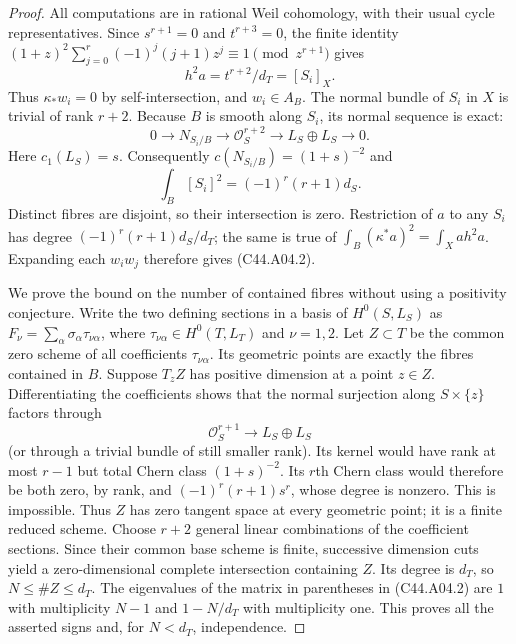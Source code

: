 \documentclass[11pt]{article}
\theoremstyle{remark}\newtheorem{remark}[theorem]{Remark}
\begin{document}
\begin{proof}
All computations are in rational Weil cohomology, with their usual
cycle representatives. Since $s^{r+1}=0$ and $t^{r+3}=0$, the finite
identity $(1+z)^2\sum_{j=0}^r(-1)^j(j+1)z^j\equiv1\pmod{z^{r+1}}$
gives
\[
                      h^2a=t^{r+2}/d_T=[S_i]_X.
\]
Thus $\kappa_*w_i=0$ by self-intersection, and $w_i\in A_B$.
The normal bundle of $S_i$ in $X$ is trivial of rank $r+2$.
Because $B$ is smooth along $S_i$, its normal sequence is exact:
\[
 0\longrightarrow N_{S_i/B}\longrightarrow\mathcal O_S^{r+2}
   \longrightarrow L_S\oplus L_S\longrightarrow0.
\]
Here $c_1(L_S)=s$. Consequently
$c(N_{S_i/B})=(1+s)^{-2}$ and
\[
                 \int_B[S_i]^2=(-1)^r(r+1)d_S.
\]
Distinct fibres are disjoint, so their intersection is zero.
Restriction of $a$ to any $S_i$ has degree
$(-1)^r(r+1)d_S/d_T$; the same is true of
$\int_B(\kappa^*a)^2=\int_Xa h^2a$.
Expanding each $w_iw_j$ therefore gives (C44.A04.2).

We prove the bound on the number of contained fibres without using a
positivity conjecture. Write the two defining sections in a basis of
$H^0(S,L_S)$ as
$F_\nu=\sum_\alpha\sigma_\alpha\tau_{\nu\alpha}$,
where $\tau_{\nu\alpha}\in H^0(T,L_T)$ and $\nu=1,2$.
Let $Z\subset T$ be the common zero scheme of all coefficients
$\tau_{\nu\alpha}$. Its geometric points are exactly the fibres
contained in $B$. Suppose $T_zZ$ has positive dimension at a point
$z\in Z$. Differentiating the coefficients shows that the normal
surjection along $S\times\{z\}$ factors through
\[
       \mathcal O_S^{r+1}\longrightarrow L_S\oplus L_S
\]
(or through a trivial bundle of still smaller rank). Its kernel
would have rank at most $r-1$ but total Chern class $(1+s)^{-2}$.
Its $r$th Chern class would therefore be both zero, by rank, and
$(-1)^r(r+1)s^r$, whose degree is nonzero. This is impossible.
Thus $Z$ has zero tangent space at every geometric point; it is a
finite reduced scheme. Choose $r+2$ general linear combinations of
the coefficient sections. Since their common base scheme is finite,
successive dimension cuts yield a zero-dimensional complete
intersection containing $Z$. Its degree is $d_T$, so
$N\le\#Z\le d_T$.
The eigenvalues of the matrix in parentheses in (C44.A04.2) are
$1$ with multiplicity $N-1$ and $1-N/d_T$ with multiplicity one.
This proves all the asserted signs and, for $N<d_T$, independence.


\end{proof}
\end{document}
